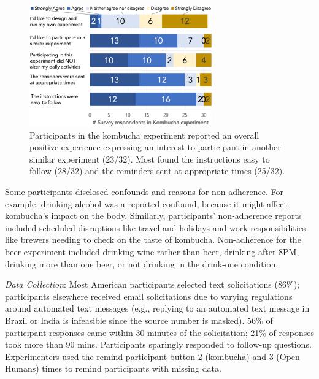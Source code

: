 
\begin{figure}[h]
\centering
  \includegraphics[width=0.7\textwidth]{figures/galileo/galileo-study3-2}
  \caption[Participants in the kombucha experiment reported an overall positive experience]
{Participants in the kombucha experiment reported an overall positive experience expressing an interest to participant in another similar experiment (23/32). Most found the instructions easy to follow (28/32) and the reminders sent at appropriate times (25/32). }
  \label{fig:galileo-12-result}
\end{figure}

Some participants disclosed confounds and reasons for non-adherence. For example, drinking alcohol was a reported confound, because it might affect kombucha's impact on the body. Similarly, participants' non-adherence reports included scheduled disruptions like travel and holidays and work responsibilities like brewers needing to check on the taste of kombucha. Non-adherence for the beer experiment included drinking wine rather than beer, drinking after 8PM, drinking more than one beer, or not drinking in the drink-one condition.

\textit{Data Collection}: Most American participants selected text solicitations (86\%); participants elsewhere received email solicitations due to varying regulations around automated text messages (e.g., replying to an automated text message in Brazil or India is infeasible since the source number is masked). 56\% of participant responses came within 30 minutes of the solicitation; 21\% of responses took more than 90 mins. Participants sparingly responded to follow-up questions. Experimenters used the remind participant button 2 (kombucha) and 3 (Open Humans) times to remind participants with missing data.

